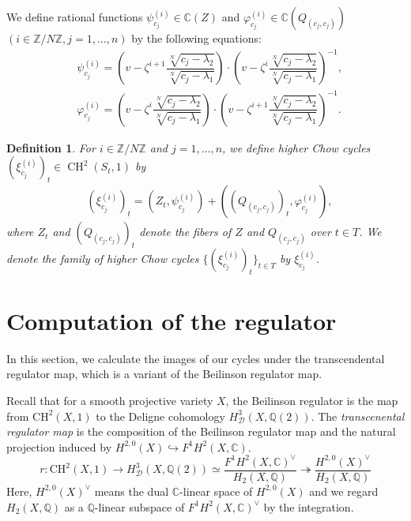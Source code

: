 \documentclass[letterpaper, 11pt]{amsart}
\theoremstyle{my theoremstyle}
\theoremstyle{dfn}
\newtheorem{dfn}[thm]{Definition}
\theoremstyle{remark}
\renewcommand{\1}{\mathbbm{1}}
\newcommand{\C}{\mathbb{C}}
\newcommand{\Q}{\mathbb{Q}}
\newcommand{\Z}{\mathbb{Z}}
\renewcommand{\l}{\lambda}
\newcommand{\ch}{\operatorname{CH}}
\numberwithin{equation}{section}
\begin{document}
We define rational functions $\psi^{(i)}_{c_j} \in \C(Z)$ and $\varphi^{(i)}_{c_j} \in \C(Q_{(c_j, c_j)})$ $(i \in \Z/N\Z, j=1, \ldots, n)$ by the following equations: 
\begin{align*}
& \psi^{(i)}_{c_j}=\left(v-\zeta^{i+1} \dfrac{\sqrt[N]{c_j-\l_2}}{\sqrt[N]{c_j-\l_1}} \right) \cdot \left(v- \zeta^i \dfrac{\sqrt[N]{c_j-\l_2}}{\sqrt[N]{c_j-\l_1}} \right)^{-1},  \\
&\varphi^{(i)}_{c_j}=\left(v- \zeta^{i}\dfrac{\sqrt[N]{c_j-\l_2}}{\sqrt[N]{c_j-\l_1}} \right) \cdot \left(v-\zeta^{i+1} \dfrac{\sqrt[N]{c_j-\l_2}}{\sqrt[N]{c_j-\l_1}} \right)^{-1}.  
\end{align*}
\begin{dfn} \label{cycledef}
For $i \in \Z/N\Z$ and $j=1, \ldots, n$, we define higher Chow cycles $(\xi^{(i)}_{c_j})_t\in \ch^2(S_t,1)$ by 
\begin{align*}
&(\xi_{c_j}^{(i)})_t=(Z_t, \psi_{c_j}^{(i)}) +((Q_{(c_j, c_j)})_t, \varphi_{c_j}^{(i)}),  
\end{align*}
where $Z_t$ and $(Q_{(c_j, c_j)})_t$ denote the fibers of $Z$ and $Q_{(c_j, c_j)}$ over $t\in T$.
We denote the family of higher Chow cycles $\{(\xi^{(i)}_{c_j})_t\}_{t \in T}$ by $\xi^{(i)}_{c_j}$.


\end{dfn}


\section{Computation of the regulator} \label{computeReg}
In this section, we calculate the images of our cycles
under the transcendental regulator map, which is a variant of the Beilinson regulator map.

Recall that for a smooth projective variety $X$, the Beilinson regulator is the map from $\mathrm{CH}^2(X,1)$ to the Deligne cohomology $H^3_{\mathcal D}(X,\Q(2))$.
The \textit{transcenental regulator map} is the composition of the Beilinson regulator map and the natural projection induced by $H^{2,0}(X) \hookrightarrow F^1H^2(X,\C)$.
\begin{equation}\label{transreg}
r\colon \mathrm{CH}^2(X,1)\to H^3_{\mathcal D}(X,\Q(2))\simeq
\frac{F^1H^2(X,\C)^\vee}{H_2(X,\Q)} \twoheadrightarrow \frac{H^{2,0}(X)^\vee}{H_2(X,\Q)}
\end{equation}
Here, $H^{2,0}(X)^\vee$ means the dual $\C$-linear space of $H^{2,0}(X)$ and we regard $H_2(X,\Q)$ as a $\Q$-linear subspace of $F^1H^2(X,\C)^\vee$ by the integration.
\end{document}

